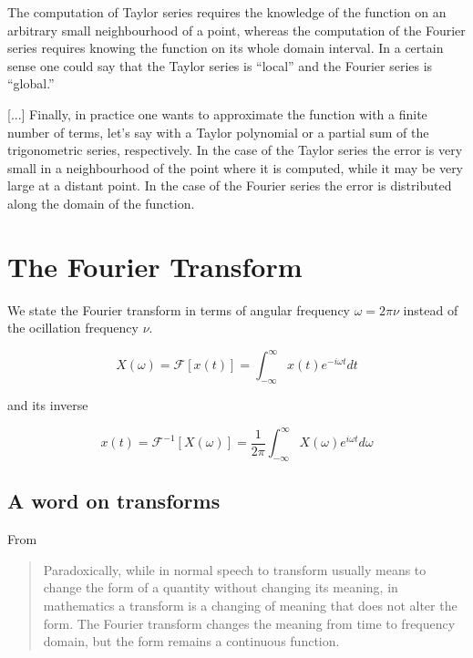 \documentclass[11pt]{article}
\theoremstyle{plain}
\theoremstyle{definition}
\theoremstyle{remark}
\begin{document}
\begin{blockquote}

The computation of Taylor series requires the knowledge of the function on an arbitrary small neighbourhood of a point, whereas the computation of the Fourier series requires knowing the function on its whole domain interval. In a certain sense one could say that the Taylor series is ``local'' and the Fourier series is ``global.''

[...] Finally, in practice one wants to approximate the function with a finite number of terms, let's say with a Taylor polynomial or a partial sum of the trigonometric series, respectively. In the case of the Taylor series the error is very small in a neighbourhood of the point where it is computed, while it may be very large at a distant point. In the case of the Fourier series the error is distributed along the domain of the function.

\end{blockquote}

\section{The Fourier Transform}

We state the Fourier transform in terms of angular frequency $\omega = 2 \pi \nu$
instead of the ocillation frequency $\nu$.

\begin{equation*}
	 X(\omega) = \mathcal{F}[x(t)] = \int_{-\infty}^{\infty} x(t) e^{-i \omega t} dt
\end{equation*}

and its inverse

\begin{equation*}
	x(t) = \mathcal{F}^{-1}[X(\omega)] = \frac{1}{2 \pi} \int_{-\infty}^{\infty} 
		X(\omega) e^{i \omega t} d\omega
\end{equation*}

\subsection{A word on transforms}

From \citet{Stein2000}
\blockquote{Paradoxically, while in normal speech to transform usually means to
change the form of a quantity without changing its meaning, in mathematics 
a transform is a changing of meaning that does not alter the form. The Fourier 
transform changes the meaning from time to frequency domain, but the form remains 
a continuous function.}
\end{document}
